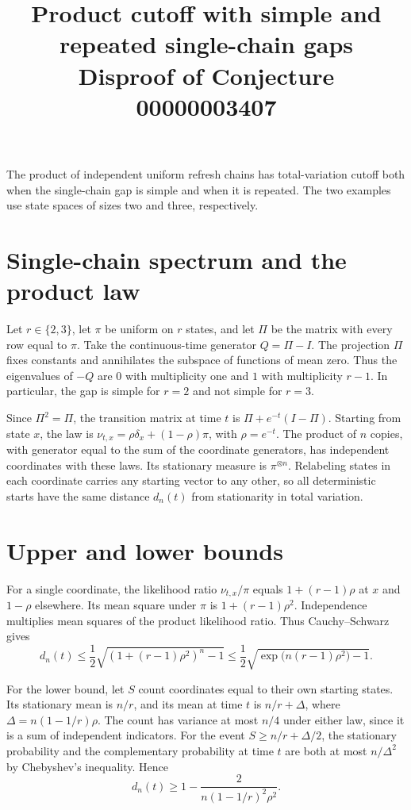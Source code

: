\documentclass[11pt]{article}
\title{Product cutoff with simple and repeated single-chain gaps\\[2pt]
  \large Disproof of Conjecture 00000003407}
\author{}
\date{}
\begin{document}
\maketitle

\noindent
The product of independent uniform refresh chains has total-variation
cutoff both when the single-chain gap is simple and when it is repeated.
The two examples use state spaces of sizes two and three, respectively.

\section*{Single-chain spectrum and the product law}

Let $r\in\{2,3\}$, let $\pi$ be uniform on $r$ states, and let $\Pi$ be
the matrix with every row equal to $\pi$. Take the continuous-time
generator $Q=\Pi-I$. The projection $\Pi$ fixes constants and annihilates
the subspace of functions of mean zero. Thus the eigenvalues of $-Q$ are
$0$ with multiplicity one and $1$ with multiplicity $r-1$. In particular,
the gap is simple for $r=2$ and not simple for $r=3$.

Since $\Pi^2=\Pi$, the transition matrix at time $t$ is
$\Pi+e^{-t}(I-\Pi)$. Starting from state $x$, the law is
$\nu_{t,x}=\rho\delta_x+(1-\rho)\pi$, with $\rho=e^{-t}$. The product of
$n$ copies, with generator equal to the sum of the coordinate generators,
has independent coordinates with these laws. Its stationary measure is
$\pi^{\otimes n}$. Relabeling states in each coordinate carries any
starting vector to any other, so all deterministic starts have the same
distance $d_n(t)$ from stationarity in total variation.

\section*{Upper and lower bounds}

For a single coordinate, the likelihood ratio $\nu_{t,x}/\pi$ equals
$1+(r-1)\rho$ at $x$ and $1-\rho$ elsewhere. Its mean square under $\pi$
is $1+(r-1)\rho^2$. Independence multiplies mean squares of the product
likelihood ratio. Thus Cauchy--Schwarz gives
\[
 d_n(t)\le \frac12\sqrt{(1+(r-1)\rho^2)^n-1}
 \le \frac12\sqrt{\exp\bigl(n(r-1)\rho^2\bigr)-1}.
\]

For the lower bound, let $S$ count coordinates equal to their own starting
states. Its stationary mean is $n/r$, and its mean at time $t$ is
$n/r+\Delta$, where $\Delta=n(1-1/r)\rho$. The count has variance at most
$n/4$ under either law, since it is a sum of independent indicators. For
the event $S\ge n/r+\Delta/2$, the stationary probability and the
complementary probability at time $t$ are both at most $n/\Delta^2$ by
Chebyshev's inequality. Hence
\[
 d_n(t)\ge 1-\frac{2}{n(1-1/r)^2\rho^2}.
\]
\end{document}
